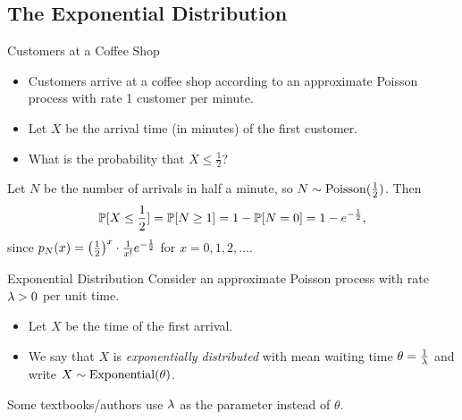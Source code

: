 \documentclass[class=article, crop=false]{standalone}
\begin{document}
  \subsection{The Exponential Distribution}
  \begin{example}{Customers at a Coffee Shop}
    \begin{itemize}
      \item Customers arrive at a coffee shop according to an approximate Poisson process with rate 1 customer per minute.
      \item Let $X$ be the arrival time (in minutes) of the first customer.
      \item What is the probability that $X \leq \frac{1}{2}$?
    \end{itemize}
    Let $N$ be the number of arrivals in half a minute, so $N\sim \Poisson(\frac{1}{2})$. Then
    \[
      \P[X \leq \frac{1}{2}] = \P[N \geq 1] = 1 - \P[N = 0] = 1 - e^{-\frac{1}{2}},
    \]
    since $p_N(x) = \paren{\frac{1}{2}}^x\cdot \frac{1}{x!}e^{-\frac{1}{2}}$ for $x = 0,1,2,\dotsc$.
  \end{example}
  \begin{definition}{Exponential Distribution}
    Consider an approximate Poisson process with rate $\lam > 0$ per unit time.
    \begin{itemize}
      \item Let $X$ be the time of the first arrival.
      \item We say that $X$ is \emph{exponentially distributed} with mean waiting time $\theta = \frac{1}{\lam}$ and write $X\sim \Exponential(\theta)$.
    \end{itemize}
  \end{definition}
  \begin{note}{}
    Some textbooks/authors use $\lam$ as the parameter instead of $\theta$.
  \end{note}
\end{document}
